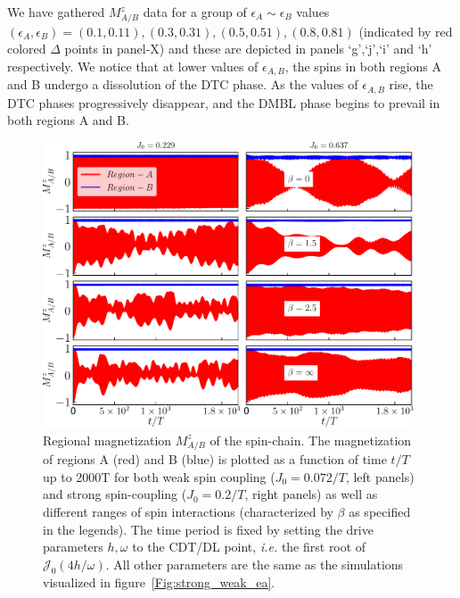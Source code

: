 \documentclass[12pt]{iopart}
\begin{document}
We have gathered $M^z_{A/B}$ data for a group of $\epsilon_A \sim \epsilon_B$ values $(\epsilon_{A},\epsilon_{B}) = {(0.1,0.11), (0.3,0.31),(0.5,0.51),(0.8,0.81)}$ (indicated by red colored $\Delta$ points in panel-X) and these are depicted in panels `g',`j',`i' and `h' respectively. We notice that at lower values of $\epsilon_{A,B}$, the spins in both regions A and B undergo a dissolution of the DTC phase. As the values of $\epsilon_{A,B}$ rise, the DTC phases progressively disappear, and the DMBL phase begins to prevail in both regions A and B.
\begin{figure}[t]
	\centering
	\hspace{1.5cm}\includegraphics[width = 11cm]{figure9.pdf}
	\caption{Regional magnetization $M^z_{A/B}$ of the spin-chain. The magnetization of regions A (red) and B (blue) is plotted as a function of time $t/T$ up to 2000T for both weak spin coupling ($J_0=0.072/T$, left panels) and strong spin-coupling ($J_0=0.2/T$, right panels) as well as different ranges of spin interactions (characterized by $\beta$ as specified in the legends). The time period is fixed by setting the drive parameters $h,\omega$ to the CDT/DL point, \textit{i.e.} the first root of $\mathcal{J}_0(4h/\omega)$. All other parameters are the same as the simulations visualized in figure~\ref{Fig:strong_weak_ea}.}
	\label{Fig:regiogionalmag}
\end{figure}
\end{document}
